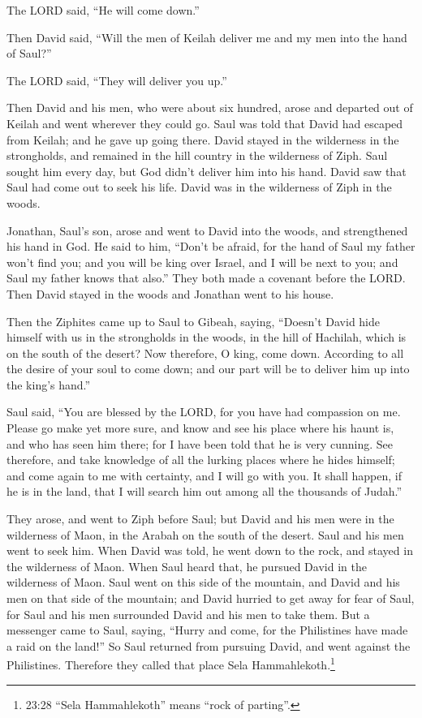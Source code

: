 The LORD said, “He will come down.”

\myverse{}Then David said, “Will the men of Keilah deliver me and my men
into the hand of Saul?”

The LORD said, “They will deliver you up.”

\myverse{}Then David and his men, who were about six hundred, arose and
departed out of Keilah and went wherever they could go. Saul was told that David had escaped from Keilah;
and he gave up going there.
\myverse{}David stayed in the wilderness in the strongholds, and remained in the hill
country in the wilderness of Ziph. Saul sought him every day, but God didn’t deliver him into his hand.
\myverse{}David saw that Saul had come out to seek his life. David was in the wilderness
of Ziph in the woods.

\myverse{}Jonathan, Saul’s son, arose and went to David into the woods,
and strengthened his hand in God.
\myverse{}He said to him, “Don’t be afraid, for the hand of Saul my father won’t find
you; and you will be king over Israel, and I will be next to you; and Saul my father knows that also.”
\myverse{}They both made a covenant before the LORD. Then David stayed in the woods
and Jonathan went to his house.

\myverse{}Then the Ziphites came up to Saul to Gibeah, saying, “Doesn’t
David hide himself with us in the strongholds in the woods, in the hill of Hachilah, which is on the south
of the desert?
\myverse{}Now therefore, O king, come down. According to all the desire of your soul
to come down; and our part will be to deliver him up into the king’s hand.”

\myverse{}Saul said, “You are blessed by the LORD, for you have had compassion
on me.
\myverse{}Please go make yet more sure, and know and see his place where his haunt
is, and who has seen him there; for I have been told that he is very cunning.
\myverse{}See therefore, and take knowledge of all the lurking places where he hides
himself; and come again to me with certainty, and I will go with you. It shall happen, if he is in the
land, that I will search him out among all the thousands of Judah.”

\myverse{}They arose, and went to Ziph before Saul; but David and his
men were in the wilderness of Maon, in the Arabah on the south of the desert.
\myverse{}Saul and his men went to seek him. When David was told, he went down to the
rock, and stayed in the wilderness of Maon. When Saul heard that, he pursued David in the wilderness of
Maon.
\myverse{}Saul went on this side of the mountain, and David and his men on that side
of the mountain; and David hurried to get away for fear of Saul, for Saul and his men surrounded David
and his men to take them.
\myverse{}But a messenger came to Saul, saying, “Hurry and come, for the Philistines
have made a raid on the land!”
\myverse{}So Saul returned from pursuing David, and went against the Philistines. Therefore
they called that place Sela Hammahlekoth.\footnote{23:28 “Sela Hammahlekoth” means “rock of parting”.}

